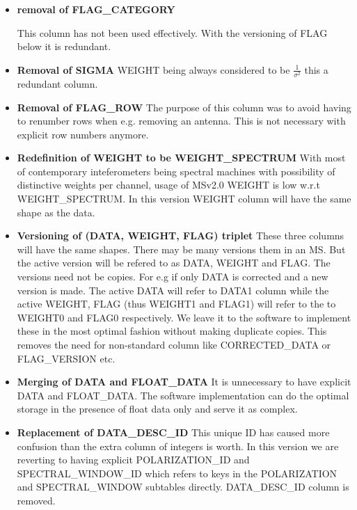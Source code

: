 \documentclass{article}
\begin{document}
\begin{itemize}


\item{{\bf removal of FLAG\_CATEGORY}


    This column has not been used effectively. With the versioning of
    FLAG below it is redundant.

}
\item{{\bf Removal of SIGMA} WEIGHT being always considered to be
    $\frac{1}{\sigma^2}$ this a redundant column.}


\item{{\bf Removal of FLAG\_ROW}
The purpose of this column was to avoid having to renumber rows when e.g. removing an antenna. This is not necessary with explicit row numbers anymore.
}

\item{{\bf Redefinition of WEIGHT to be WEIGHT\_SPECTRUM} With most of
    contemporary inteferometers being spectral machines with
    possibility of distinctive weights per channel, usage of MSv2.0
    WEIGHT is low w.r.t WEIGHT\_SPECTRUM. In this version WEIGHT
    column will have the same shape as the data.  }

\item{{\bf Versioning of (DATA, WEIGHT, FLAG) triplet} These three
    columns will have the same shapes. There may be many versions them
    in an MS. But the active version will be refered to as DATA,
    WEIGHT and FLAG.  The versions need not be copies. For e.g if only
    DATA is corrected and a new version is made. The active DATA will
    refer to DATA1 column while the active WEIGHT, FLAG (thus WEIGHT1
    and FLAG1) will refer to the to WEIGHT0 and FLAG0 respectively. We
    leave it to the software to implement these in the most optimal
    fashion without making duplicate copies. This removes the need for
    non-standard column like CORRECTED\_DATA or FLAG\_VERSION etc.

}

\item{{\bf Merging of DATA and FLOAT\_DATA} It is unnecessary to have
    explicit DATA and FLOAT\_DATA. The software implementation can do
    the optimal storage in the presence of float data only and serve
    it as complex.  }

\item{{\bf Replacement of DATA\_DESC\_ID} This unique ID has caused
    more confusion than the extra column of integers is worth. In this
    version we are reverting to having explicit POLARIZATION\_ID and
    SPECTRAL\_WINDOW\_ID which refers to keys in the POLARIZATION and
    SPECTRAL\_WINDOW subtables directly. DATA\_DESC\_ID column is
    removed.}


\end{itemize}
\end{document}
